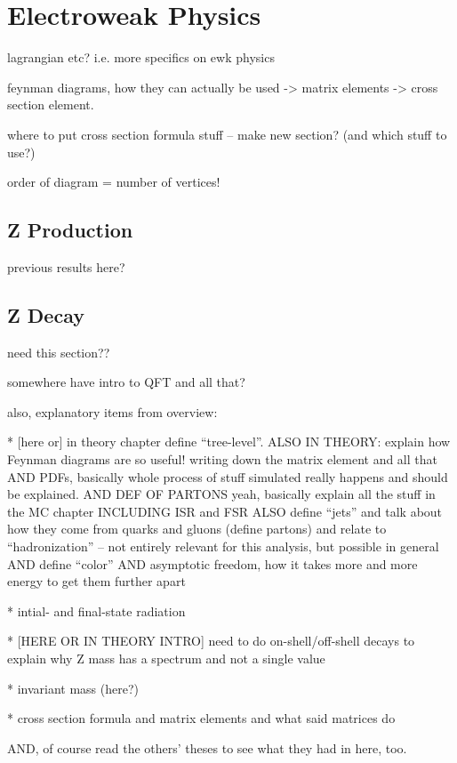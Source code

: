 \section{Electroweak Physics}
\label{theory:EWK}

lagrangian etc? i.e. more specifics on ewk physics

feynman diagrams, how they can actually be used -> 
matrix elements -> cross section element.  

where to put cross section formula stuff 
-- make new section?
(and which stuff to use?)

order of diagram = number of vertices!  

\subsection{Z Production}
\label{theory:Zprod}

previous results here?

\subsection{Z Decay}
\label{theory:Zdec}
need this section??


somewhere have intro to QFT and all that?  

also, explanatory items from overview:

   * [here or] in theory chapter define ``tree-level''.  
ALSO IN THEORY: explain how Feynman diagrams are so useful! 
writing down the matrix element and all that
AND PDFs, basically whole process of stuff simulated 
really happens and should be explained.  
AND DEF OF PARTONS
yeah, basically explain all the stuff in the MC chapter
INCLUDING ISR and FSR
ALSO define ``jets'' and talk about how they come from 
quarks and gluons (define partons) and relate to ``hadronization'' -- 
not entirely relevant for this analysis, 
but possible in general
AND define ``color''
AND asymptotic freedom, how it takes more and more energy to get them further apart

   * intial- and final-state radiation

   * [HERE OR IN THEORY INTRO] need to do on-shell/off-shell decays 
to explain why Z mass has a spectrum and not a single value

   * invariant mass (here?)

   * cross section formula and matrix elements and what said matrices do

AND, of course read the others' theses to see what they had in here, too.  



